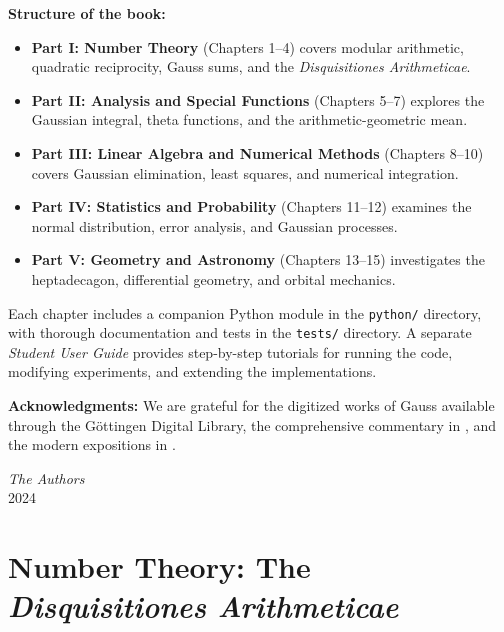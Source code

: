 \documentclass[12pt,oneside]{book}
\begin{document}
\textbf{Structure of the book:}
\begin{itemize}
    \item \textbf{Part I: Number Theory} (Chapters 1--4) covers modular arithmetic, quadratic reciprocity, Gauss sums, and the \textit{Disquisitiones Arithmeticae}.
    \item \textbf{Part II: Analysis and Special Functions} (Chapters 5--7) explores the Gaussian integral, theta functions, and the arithmetic-geometric mean.
    \item \textbf{Part III: Linear Algebra and Numerical Methods} (Chapters 8--10) covers Gaussian elimination, least squares, and numerical integration.
    \item \textbf{Part IV: Statistics and Probability} (Chapters 11--12) examines the normal distribution, error analysis, and Gaussian processes.
    \item \textbf{Part V: Geometry and Astronomy} (Chapters 13--15) investigates the heptadecagon, differential geometry, and orbital mechanics.
\end{itemize}

Each chapter includes a companion Python module in the \texttt{python/} directory, with thorough documentation and tests in the \texttt{tests/} directory. A separate \textit{Student User Guide} provides step-by-step tutorials for running the code, modifying experiments, and extending the implementations.

\textbf{Acknowledgments:} We are grateful for the digitized works of Gauss available through the G\"ottingen Digital Library, the comprehensive commentary in \cite{gauss-works}, and the modern expositions in \cite{edwards-fermat, stillwell-number-theory, cohen-number-theory}.

\begin{flushright}
    \textit{The Authors}\\
    2024
\end{flushright}

\cleardoublepage

\tableofcontents

\cleardoublepage

\listoffigures
\listoftables

\cleardoublepage

\mainmatter

\part{Number Theory: The \textit{Disquisitiones Arithmeticae}}
\end{document}
